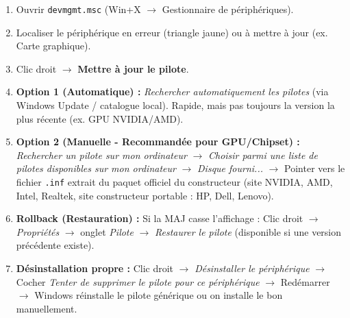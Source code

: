 \documentclass[11pt]{article}
\begin{document}
\begin{methode}
\begin{enumerate}
    \item Ouvrir \texttt{devmgmt.msc} (Win+X $\rightarrow$ Gestionnaire de périphériques).
    \item Localiser le périphérique en erreur (triangle jaune) ou à mettre à jour (ex. Carte graphique).
    \item Clic droit $\rightarrow$ \textbf{Mettre à jour le pilote}.
    \item \textbf{Option 1 (Automatique) :} \emph{Rechercher automatiquement les pilotes} (via Windows Update / catalogue local). Rapide, mais pas toujours la version la plus récente (ex. GPU NVIDIA/AMD).
    \item \textbf{Option 2 (Manuelle - Recommandée pour GPU/Chipset) :} \emph{Rechercher un pilote sur mon ordinateur} $\rightarrow$ \emph{Choisir parmi une liste de pilotes disponibles sur mon ordinateur} $\rightarrow$ \emph{Disque fourni...} $\rightarrow$ Pointer vers le fichier \texttt{.inf} extrait du paquet officiel du constructeur (site NVIDIA, AMD, Intel, Realtek, site constructeur portable : HP, Dell, Lenovo).
    \item \textbf{Rollback (Restauration) :} Si la MAJ casse l'affichage : Clic droit $\rightarrow$ \emph{Propriétés} $\rightarrow$ onglet \emph{Pilote} $\rightarrow$ \emph{Restaurer le pilote} (disponible si une version précédente existe).
    \item \textbf{Désinstallation propre :} Clic droit $\rightarrow$ \emph{Désinstaller le périphérique} $\rightarrow$ Cocher \emph{Tenter de supprimer le pilote pour ce périphérique} $\rightarrow$ Redémarrer $\rightarrow$ Windows réinstalle le pilote générique ou on installe le bon manuellement.
\end{enumerate}
\end{methode}
\end{document}
